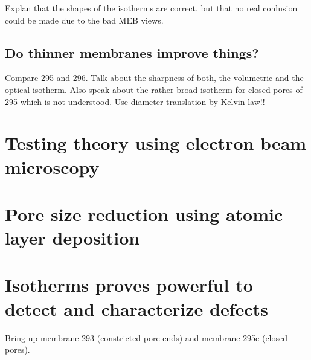 \documentclass[../thesis.tex]{subfiles}
\begin{document}
                  Explan that the shapes of the isotherms are correct, but that no real conlusion could be made due to the bad MEB views.



        \subsection{Do thinner membranes improve things?}
        \label{sec:thinner-membranes}

          Compare 295 and 296. Talk about the sharpness of both, the volumetric and the optical isotherm. Also speak about the rather broad isotherm for closed pores of 295 which is not understood. Use diameter translation by Kelvin law!!


      \section{Testing theory using electron beam microscopy}
      \label{sec:testing-theory}


      \section{Pore size reduction using atomic layer deposition}


      \section{Isotherms proves powerful to detect and characterize defects}
      \label{sec:theory-and-defects}

      Bring up membrane 293 (constricted pore ends) and membrane 295c (closed pores).
\end{document}
